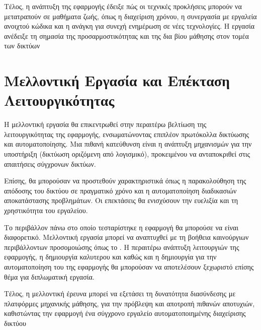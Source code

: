 Τέλος, η ανάπτυξη της εφαρμογής έδειξε πώς οι 
τεχνικές προκλήσεις μπορούν να μετατραπούν σε μαθήματα ζωής, 
όπως η διαχείριση χρόνου, η συνεργασία με εργαλεία ανοιχτού 
κώδικα και η ανάγκη για συνεχή ενημέρωση σε νέες τεχνολογίες. 
Η εργασία ανέδειξε τη σημασία της προσαρμοστικότητας και της 
δια βίου μάθησης στον τομέα των δικτύων

\section{Μελλοντική Εργασία και Επέκταση Λειτουργικότητας}

Η μελλοντική εργασία θα επικεντρωθεί στην περαιτέρω 
βελτίωση της λειτουργικότητας της εφαρμογής, ενσωματώνοντας 
επιπλέον πρωτόκολλα δικτύωσης και αυτοματοποίησης. 
Μια πιθανή κατεύθυνση είναι η ανάπτυξη μηχανισμών για την 
υποστήριξη  (δικτύωση οριζόμενη από λογισμικό), 
προκειμένου να ανταποκριθεί στις απαιτήσεις σύγχρονων δικτύων.

Επίσης, θα μπορούσαν να προστεθούν χαρακτηριστικά όπως 
η παρακολούθηση της απόδοσης του δικτύου σε πραγματικό 
χρόνο και η αυτοματοποίηση διαδικασιών αποκατάστασης προβλημάτων. 
Οι επεκτάσεις θα ενισχύσουν την ευελιξία και τη χρηστικότητα του 
εργαλείου.

Το περιβάλλον πάνω στο οποίο τεσταρίστηκε η εφαρμογή θα μπορούσε να είναι διαφορετικό.
Μελλοντική εργασία μπορεί να αναπτυχθεί με τη βοήθεια καινούργιων περιβάλλοντων προσομοιώσης όπως
το . Η περαιτέρω ανάπτυξη λειτουργιών της εφαρμογής, η δημιουργία καλυτερου 
και  καθώς και η δημιουργία  για την αυτοματοποίηση
του  της εφαρμογής θα μπορούσαν να αποτελέσουν ξεχωριστό επίσης θέμα για διπλωματική εργασία.

Τέλος, η μελλοντική έρευνα μπορεί να εξετάσει τη δυνατότητα διασύνδεσης με 
πλατφόρμες μηχανικής μάθησης, για την 
πρόβλεψη και αποτροπή πιθανών αποτυχιών, 
καθιστώντας την εφαρμογή ένα σύγχρονο εργαλείο 
αυτοματοποιημένης διαχείρισης δικτύου